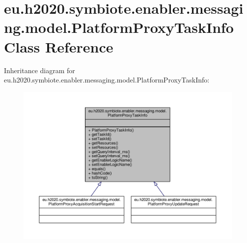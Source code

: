 \hypertarget{classeu_1_1h2020_1_1symbiote_1_1enabler_1_1messaging_1_1model_1_1PlatformProxyTaskInfo}{}\section{eu.\+h2020.\+symbiote.\+enabler.\+messaging.\+model.\+Platform\+Proxy\+Task\+Info Class Reference}
\label{classeu_1_1h2020_1_1symbiote_1_1enabler_1_1messaging_1_1model_1_1PlatformProxyTaskInfo}


Inheritance diagram for eu.\+h2020.\+symbiote.\+enabler.\+messaging.\+model.\+Platform\+Proxy\+Task\+Info\+:\nopagebreak
\begin{figure}[H]
\begin{center}
\leavevmode
\includegraphics[width=350pt]{classeu_1_1h2020_1_1symbiote_1_1enabler_1_1messaging_1_1model_1_1PlatformProxyTaskInfo__inherit__graph}
\end{center}
\end{figure}



